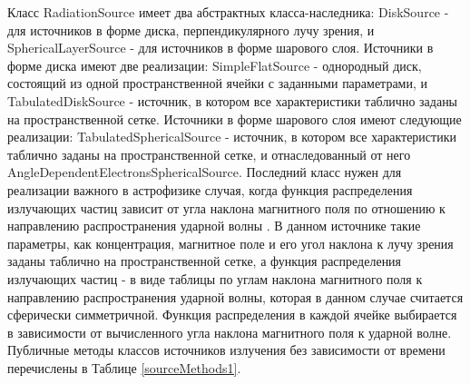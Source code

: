 Класс RadiationSource имеет два абстрактных класса-наследника: DiskSource - для источников в форме диска, перпендикулярного лучу зрения, и SphericalLayerSource - для источников в форме шарового слоя. Источники в форме диска имеют две реализации: SimpleFlatSource - однородный диск, состоящий из одной пространственной ячейки с заданными параметрами, и TabulatedDiskSource - источник, в котором все характеристики таблично заданы на пространственной сетке. Источники в форме шарового слоя имеют следующие реализации: TabulatedSphericalSource - источник, в котором все характеристики таблично заданы на пространственной сетке, и отнаследованный от него AngleDependentElectronsSphericalSource. Последний класс нужен для реализации важного в астрофизике случая, когда функция распределения излучающих частиц зависит от угла наклона магнитного поля по отношению к направлению распространения ударной волны \cite{SironiSpitkovsky2009pair, GuoSironi2014_1,Crumley2019, Romansky2018, еще}. В данном источнике такие параметры, как концентрация, магнитное поле и его угол наклона к лучу зрения заданы таблично на пространственной сетке, а функция распределения излучающих частиц - в виде таблицы по углам наклона магнитного поля к направлению распространения ударной волны, которая в данном случае считается сферически симметричной. Функция распределения в каждой ячейке выбирается в зависимости от вычисленного угла наклона магнитного поля к ударной волне. Публичные методы классов источников излучения без зависимости от времени перечислены в Таблице \ref{sourceMethods1}.


